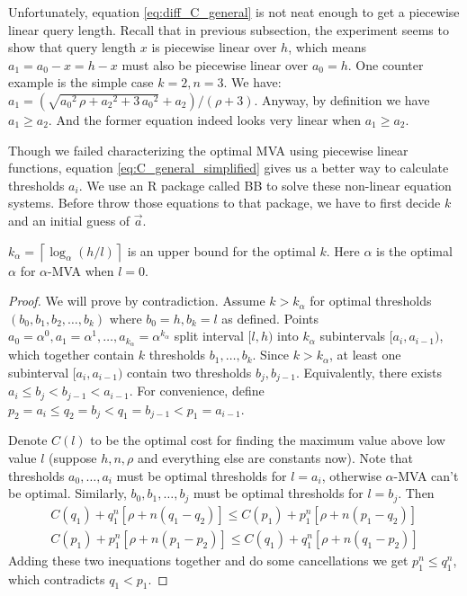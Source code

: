 Unfortunately, equation
\ref{eq:diff_C_general} is not neat enough to get a piecewise linear query length.
Recall that in previous subsection, the experiment seems to show that query length $x$ is
piecewise linear over $h$, which means $a_1 = a_0-x = h-x$ must also be
piecewise linear over $a_0 = h$.  One counter example is the simple case $k = 2, n =
3$. We have: $a_1 =
(\sqrt{{a_0}^{2}\,\rho+{a_2}^{2}+3\,{a_0}^{2}}+a_2)/(\rho+3)$.  Anyway, by
definition we have $a_1 \geq a_2$. And
the former equation indeed looks very linear when $a_1 \geq a_2$.

Though we failed characterizing the optimal MVA using piecewise linear
functions, equation \ref{eq:C_general_simplified} gives us a better way to
calculate thresholds $a_i$. We use an R package called BB \cite{Varadhan2009:BB} to
solve these non-linear equation systems. Before throw those equations to that
package, we have to first decide $k$ and an initial guess of $\vec a$.

\begin{lemma}\label{lemma:k_upper}
$k_\alpha = \left\lceil \log_{\alpha} \left(h/l\right) \right\rceil$ is an
upper bound for the optimal $k$. Here $\alpha$ is the optimal $\alpha$ for
$\alpha$-MVA when $l = 0$. 
\end{lemma}

\begin{proof}
We will prove by contradiction. Assume $k > k_\alpha$ for optimal thresholds
$(b_0, b_1, b_2, \ldots, b_k)$ where $b_0 = h, b_k = l$ as defined.  Points
$a_0 = \alpha^0, a_1 = \alpha^1, \ldots, a_{k_\alpha} = \alpha^{k_\alpha}$
split interval $[l, h)$ into $k_\alpha$ subintervals $[a_i, a_{i-1})$, which
together contain $k$ thresholds $b_1, \ldots, b_k$. Since $k > k_\alpha$, at
least one subinterval $[a_i, a_{i-1})$ contain two thresholds $b_j, b_{j-1}$.
Equivalently, there exists $a_i \leq b_j < b_{j-1} < a_{i-1}$.  For
convenience, define $p_2 = a_i \leq q_2 = b_j < q_1 = b_{j-1} < p_1 = a_{i-1}$.

Denote $C(l)$ to be the optimal cost for finding the maximum value above low
value $l$ (suppose $h, n, \rho$ and everything else are constants now). Note
that thresholds $a_0, \ldots, a_i$ must be optimal thresholds for $l = a_i$,
otherwise $\alpha$-MVA can't be optimal.  Similarly, $b_0, b_1, \ldots, b_j$
must be optimal thresholds for $l = b_j$.  Then 
\begin{align*}
  C(q_1) + q_1^n [\rho+n(q_1-q_2)] \leq C(p_1) + p_1^n [\rho + n(p_1-q_2)]\\
  C(p_1) + p_1^n [\rho+n(p_1-p_2)] \leq C(q_1) + q_1^n [\rho + n(q_1-p_2)]
\end{align*}
Adding these two inequations together and do some cancellations we get
$p_1^n \leq q_1^n$, which contradicts $q_1 < p_1$.
\end{proof}

